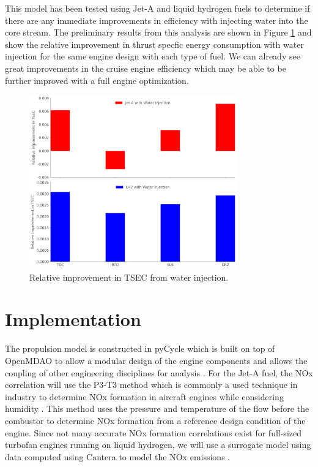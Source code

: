 \documentclass[conf]{new-aiaa}
\begin{document}
This model has been tested using Jet-A and liquid hydrogen fuels to determine if there are any immediate improvements in efficiency with injecting water into the core stream.
The preliminary results from this analysis are shown in Figure \ref{fig:results} and show the relative improvement in thrust specfic energy consumption with water injection for the same engine design with each type of fuel.
We can already see great improvements in the cruise engine efficiency which may be able to be further improved with a full engine optimization.

\begin{figure}[H]
	\centering
	\includegraphics[width=0.8\textwidth]{JetA-H2_bar_chart_diff.png}
	\caption{Relative improvement in TSEC from water injection.}
	\label{fig:results}
\end{figure}

\section{Implementation}
\label{sec:imp}
The propulsion model is constructed in pyCycle which is built on top of OpenMDAO to allow a modular design of the engine components and allows the coupling of other engineering disciplines for analysis \cite{Gray2019a}.
For the Jet-A fuel, the NOx correlation will use the P3-T3 method which is commonly a used technique in industry to determine NOx formation in aircraft engines while considering humidity \cite[]{Dubois2006}.
This method uses the pressure and temperature of the flow before the combustor to determine NOx formation from a reference design condition of the engine.
Since not many accurate NOx formation correlations exist for full-sized turbofan engines running on liquid hydrogen, we will use a surrogate model using data computed using Cantera to model the NOx emissions \cite[]{cantera}.
\end{document}
